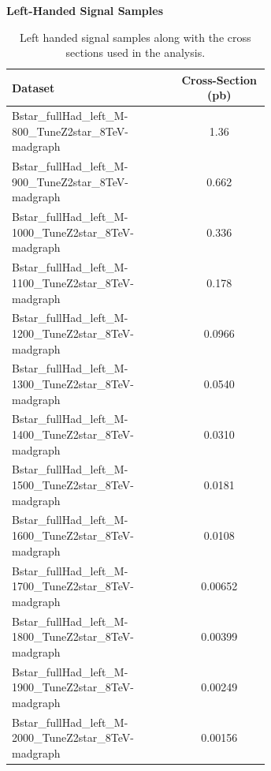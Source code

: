 \begin{table}
\begin{center}
\bf{Left-Handed Signal Samples}
\begin{tabular}{p{0.65\linewidth}|c}
\hline\hline
\bf{Dataset} &  \bf{Cross-Section (pb)} \\
\hline\hline
Bstar\_fullHad\_left\_M-800\_TuneZ2star\_8TeV-madgraph & 1.36 \\
Bstar\_fullHad\_left\_M-900\_TuneZ2star\_8TeV-madgraph & 0.662 \\
Bstar\_fullHad\_left\_M-1000\_TuneZ2star\_8TeV-madgraph & 0.336 \\ 
Bstar\_fullHad\_left\_M-1100\_TuneZ2star\_8TeV-madgraph & 0.178 \\ 
Bstar\_fullHad\_left\_M-1200\_TuneZ2star\_8TeV-madgraph & 0.0966 \\
Bstar\_fullHad\_left\_M-1300\_TuneZ2star\_8TeV-madgraph & 0.0540 \\
Bstar\_fullHad\_left\_M-1400\_TuneZ2star\_8TeV-madgraph & 0.0310 \\
Bstar\_fullHad\_left\_M-1500\_TuneZ2star\_8TeV-madgraph & 0.0181 \\
Bstar\_fullHad\_left\_M-1600\_TuneZ2star\_8TeV-madgraph & 0.0108 \\
Bstar\_fullHad\_left\_M-1700\_TuneZ2star\_8TeV-madgraph & 0.00652 \\
Bstar\_fullHad\_left\_M-1800\_TuneZ2star\_8TeV-madgraph & 0.00399 \\
Bstar\_fullHad\_left\_M-1900\_TuneZ2star\_8TeV-madgraph & 0.00249 \\
Bstar\_fullHad\_left\_M-2000\_TuneZ2star\_8TeV-madgraph & 0.00156 \\
\hline

\end{tabular}
\end{center}
\caption{Left handed signal samples along with the cross sections used in the analysis.}
\label{table:bssignalsetsleft}
\end{table}


